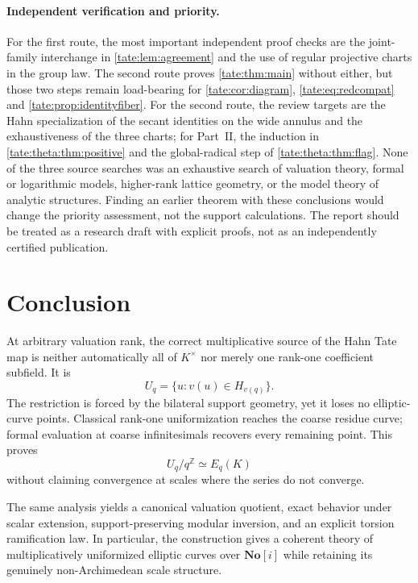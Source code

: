 \documentclass[11pt,letterpaper]{article}
\theoremstyle{definition}
\newcommand{\Z}{\mathbb Z}
\newcommand{\No}{\mathbf{No}}
\begin{document}
\paragraph{Independent verification and priority.}
For the first route, the most important independent proof checks are the
joint-family interchange in \cref{tate:lem:agreement} and the use of regular
projective charts in the group law. The second route proves
\cref{tate:thm:main} without either, but those two steps remain
load-bearing for \cref{tate:cor:diagram}, \eqref{tate:eq:redcompat} and
\cref{tate:prop:identityfiber}. For the second route, the review targets are
the Hahn specialization of the secant identities on the wide annulus and the
exhaustiveness of the three charts; for Part~II, the induction in
\cref{tate:theta:thm:positive} and the global-radical step of
\cref{tate:theta:thm:flag}. None of the three source searches was an
exhaustive search of valuation theory, formal or logarithmic models,
higher-rank lattice geometry, or the model theory of analytic structures.
Finding an earlier theorem with these conclusions would change the priority
assessment, not the support calculations. The report should be treated as
a research draft with explicit proofs, not as an independently certified
publication.

\section{Conclusion}

At arbitrary valuation rank, the correct multiplicative source of the
Hahn Tate map is neither automatically all of $K^\times$ nor merely
one rank-one coefficient subfield. It is
\[
 U_q=\{u:v(u)\in H_{v(q)}\}.
\]
The restriction is forced by the bilateral support geometry, yet it
loses no elliptic-curve points. Classical rank-one uniformization reaches
the coarse residue curve; formal evaluation at coarse infinitesimals
recovers every remaining point. This proves
\[
 U_q/q^\Z\simeq E_q(K)
\]
without claiming convergence at scales where the series do not converge.

The same analysis yields a canonical valuation quotient, exact behavior
under scalar extension, support-preserving modular inversion, and an
explicit torsion ramification law. In particular, the construction gives
a coherent theory of multiplicatively uniformized elliptic curves over
$\No[i]$ while retaining its genuinely non-Archimedean scale structure.
\end{document}
